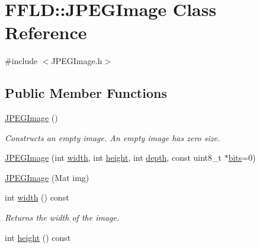 \hypertarget{class_f_f_l_d_1_1_j_p_e_g_image}{\section{F\-F\-L\-D\-:\-:J\-P\-E\-G\-Image Class Reference}
\label{class_f_f_l_d_1_1_j_p_e_g_image}
}


{\ttfamily \#include $<$J\-P\-E\-G\-Image.\-h$>$}

\subsection*{Public Member Functions}
\begin{DoxyCompactItemize}
\item 
\hypertarget{class_f_f_l_d_1_1_j_p_e_g_image_a7604bd4e0f7cf0eaa4c1f8ddd412077d}{\hyperlink{class_f_f_l_d_1_1_j_p_e_g_image_a7604bd4e0f7cf0eaa4c1f8ddd412077d}{J\-P\-E\-G\-Image} ()}\label{class_f_f_l_d_1_1_j_p_e_g_image_a7604bd4e0f7cf0eaa4c1f8ddd412077d}

\begin{DoxyCompactList}\small\item\em Constructs an empty image. An empty image has zero size. \end{DoxyCompactList}\item 
\hyperlink{class_f_f_l_d_1_1_j_p_e_g_image_a0c944c19a3c7c9deaae5027f7a29e850}{J\-P\-E\-G\-Image} (int \hyperlink{class_f_f_l_d_1_1_j_p_e_g_image_a6876061ad7198120040466d332a46bdc}{width}, int \hyperlink{class_f_f_l_d_1_1_j_p_e_g_image_aa8a99643896fd76976cb6b1629d69746}{height}, int \hyperlink{class_f_f_l_d_1_1_j_p_e_g_image_aed01a09f279c86cc1022d10f8a49204c}{depth}, const uint8\-\_\-t $\ast$\hyperlink{class_f_f_l_d_1_1_j_p_e_g_image_a428a467149c63eac24859ab257667be0}{bits}=0)
\item 
\hyperlink{class_f_f_l_d_1_1_j_p_e_g_image_a734f2d3f4870d696e68aa60d8ec12fc0}{J\-P\-E\-G\-Image} (Mat img)
\item 
\hypertarget{class_f_f_l_d_1_1_j_p_e_g_image_a6876061ad7198120040466d332a46bdc}{int \hyperlink{class_f_f_l_d_1_1_j_p_e_g_image_a6876061ad7198120040466d332a46bdc}{width} () const }\label{class_f_f_l_d_1_1_j_p_e_g_image_a6876061ad7198120040466d332a46bdc}

\begin{DoxyCompactList}\small\item\em Returns the width of the image. \end{DoxyCompactList}\item 
\hypertarget{class_f_f_l_d_1_1_j_p_e_g_image_aa8a99643896fd76976cb6b1629d69746}{int \hyperlink{class_f_f_l_d_1_1_j_p_e_g_image_aa8a99643896fd76976cb6b1629d69746}{height} () const }\label{class_f_f_l_d_1_1_j_p_e_g_image_aa8a99643896fd76976cb6b1629d69746}


\end{DoxyCompactItemize}

